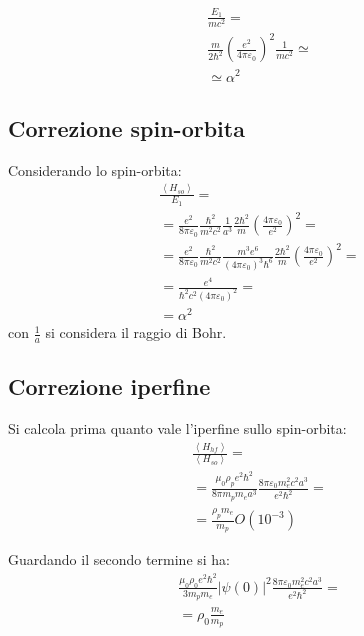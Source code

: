 \begin{equation}\begin{split}
\frac{E_1}{mc^2}=\\
\frac{m}{2\hbar ^2}\left(\frac{e^2}{4\pi\varepsilon_0}\right)^2\frac{1}{mc^2}\simeq \\
\simeq \alpha^2
\end{split}\end{equation}

\subsection{Correzione spin-orbita} %
Considerando lo spin-orbita:
\begin{equation}\begin{split}
\frac{\left\langle H_{so} \right\rangle}{E_1}=\\
=\frac{e^2}{8\pi \varepsilon_0}\frac{\hbar ^2}{m^2c^2}\frac{1}{a^3}\frac{2\hbar ^2}{m}\left(\frac{4\pi\varepsilon_0}{e^2}\right)^2=\\
=\frac{e^2}{8\pi \varepsilon_0}\frac{\hbar ^2}{m^2c^2}\frac{m^3e^6}{\left(4\pi\varepsilon_0\right)^3\hbar ^6}\frac{2\hbar ^2}{m}\left(\frac{4\pi\varepsilon_0}{e^2}\right)^2=\\
=\frac{e^4}{\hbar ^2c^2\left(4\pi\varepsilon_0\right)^2}=\\
=\alpha^2
\end{split}\end{equation}
con $\frac{1}{a}$ si considera il raggio di Bohr.

\subsection{Correzione iperfine} %
Si calcola prima quanto vale l'iperfine sullo spin-orbita:
\begin{equation}\begin{split}
\frac{\left\langle H_{hf} \right\rangle}{\left\langle H_{so} \right\rangle}=\\
=\frac{\mu_0\rho_pe^2\hbar ^2}{8\pi m_pm_ea^3}\frac{8\pi \varepsilon_0m_e^2c^2a^3}{e^2\hbar ^2}=\\
=\frac{\rho_pm_e}{m_p}O\left(10^{-3}\right)
\end{split}\end{equation}

Guardando il secondo termine si ha:
\begin{equation}\begin{split}
\frac{\mu_0\rho_0e^2\hbar ^2}{3m_pm_e}|\psi \left(0\right)|^2\frac{8\pi \varepsilon_0 m_e^2c^2a^3}{e^2\hbar ^2}=\\
=\rho_0\frac{m_e}{m_p}
\end{split}\end{equation}

